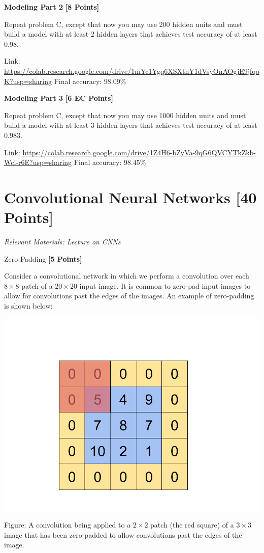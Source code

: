  \problem \textbf{Modeling Part 2} \textbf{[8 Points]}

 Repeat problem C, except that now you may use 200 hidden units and must build a model with at least 2 hidden layers that achieves test accuracy of at least 0.98.

\begin{solution}
  Link: \url{https://colab.research.google.com/drive/1mYc1Ygq6XSXtnY1dVsyOnAOgjE9jfqoK?usp=sharing}
  Final accuracy: 98.09\%
\end{solution}

 \problem \textbf{Modeling Part 3} \textbf{[6 EC Points]}

 Repeat problem C, except that now you may use 1000 hidden units and must build a model with at least 3 hidden layers that achieves test accuracy of at least 0.983.

\begin{solution}
  Link: \url{https://colab.research.google.com/drive/1Z4H6-bZyVa-9qG6QVCYTkZkb-Wcl-r6E?usp=sharing}
  Final accuracy: 98.45\%
\end{solution}

 \newpage
 \section{Convolutional Neural Networks  [40 Points]}
 \textit{Relevant Materials: Lecture on CNNs}

 \problem Zero Padding \textbf{[5 Points]}

 Consider a convolutional network in which we perform a convolution over each $8 \times 8$ patch of a $20 \times 20$ input image. It is common to zero-pad input images to allow for convolutions past the edges of the images. An example of zero-padding is shown below:

\begin{center}
  \includegraphics[width=.49\textwidth]{Plots/ConvolutionExample.png}
\end{center}
\begin{small}
Figure: A convolution being applied to a $2 \times 2$ patch (the red square) of a $3 \times 3$ image that has been zero-padded to allow convolutions past the edges of the image.
\end{small}

